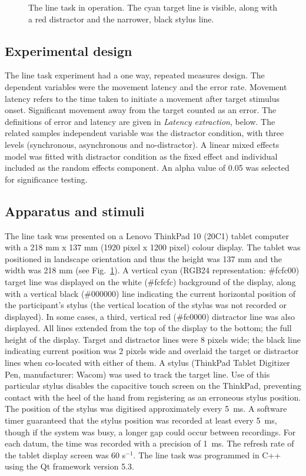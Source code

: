 \documentclass[10pt,letterpaper]{article}
\begin{document}
\begin{figure}[htb!]
\centering
\caption[The line task.]
{The line task in operation. The cyan
  target line is visible, along with a red distractor and the
  narrower, black stylus line.}
\label{linetask}
\end{figure}

\subsection*{Experimental design}
The line task experiment had a one way, repeated measures design. The
dependent variables were the movement latency and the error
rate. Movement latency refers to the time taken to initiate a movement
after target stimulus onset. Significant movement away from the target
counted as an error. The definitions of error and latency are given in
\emph{Latency extraction}, below. The related samples independent
variable was the distractor condition, with three levels (synchronous,
asynchronous and no-distractor). A linear mixed effects model was
fitted with distractor condition as the fixed effect and individual
included as the random effects component. An alpha value of 0.05 was
selected for significance testing.

\subsection*{Apparatus and stimuli}
The line task was presented on a Lenovo ThinkPad 10 (20C1) tablet
computer with a 218 mm x 137 mm (1920 pixel x 1200 pixel) colour
display. The tablet was positioned in landscape orientation and thus
the height was 137 mm and the width was 218 mm (see
Fig.~\ref{linetask}). A vertical cyan (RGB24 representation: \#fcfc00)
target line was displayed on the white (\#fcfcfc) background of the
display, along with a vertical black (\#000000) line indicating the
current horizontal position of the participant's stylus (the vertical
location of the stylus was not recorded or displayed). In some cases,
a third, vertical red (\#fc0000) distractor line was also
displayed. All lines extended from the top of the display to the
bottom; the full height of the display. Target and distractor lines
were 8 pixels wide; the black line indicating current position was 2
pixels wide and overlaid the target or distractor lines when
co-located with either of them. A stylus (ThinkPad Tablet Digitizer
Pen, manufacturer: Wacom) was used to track the target line. Use of
this particular stylus disables the capacitive touch screen on the
ThinkPad, preventing contact with the heel of the hand from
registering as an erroneous stylus position. The position of the
stylus was digitised approximately every 5~ms.
%
A software timer guaranteed that the stylus position was recorded at
least every 5~ms, though if the system was busy, a longer gap could
occur between recordings. For each datum, the time was recorded with a
precision of 1~ms.
The refresh rate of the tablet display screen was 60 s$^{-1}$. The line
task was programmed in C++ using the Qt framework version 5.3.
\end{document}
